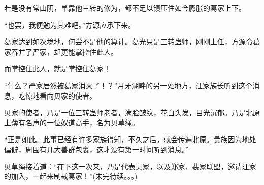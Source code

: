 \begin{this_body}
若是没有常山阴，单靠他三转的修为，都不足以镇压住如今膨胀的葛家上下。

“也罢，我便勉为其难吧。”方源应承下来。

葛家达到如次境地，何尝不是他的算计。葛光只是三转蛊师，刚刚上任，方源令葛家吞并了严家，却更能掌控住此人。

而掌控住此人，就是掌控住葛家！

“什么？严家居然被葛家消灭了！？”月牙湖畔的另一处地方，汪家族长听到这个消息，吃惊地看向贝家的使者。

贝家的使者，乃是一位三转蛊师老者，满脸皱纹，花白头发，目光沉郁。乃是北原上薄有名声的一位奴道高手，名为贝草绳。

“正是如此。此事已经有许多家族得知，不久之后，就会传遍北原。贵族因为地处偏僻，周围有几大兽群包裹，这才没有第一时间听到消息。”

贝草绳接着道：“在下这一次来，乃是代表贝家，以及郑家、裴家联盟，邀请汪家的加入，一起来制裁葛家！”(未完待续。。。)

\end{this_body}


